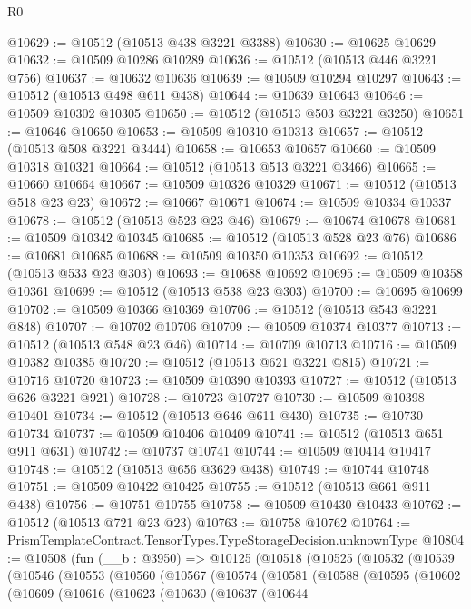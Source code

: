 \begin{lexlean}{R0}
\begin{coremodule}
@10629 := @10512 (@10513 @438 @3221 @3388)
@10630 := @10625 @10629
@10632 := @10509 @10286 @10289
@10636 := @10512 (@10513 @446 @3221 @756)
@10637 := @10632 @10636
@10639 := @10509 @10294 @10297
@10643 := @10512 (@10513 @498 @611 @438)
@10644 := @10639 @10643
@10646 := @10509 @10302 @10305
@10650 := @10512 (@10513 @503 @3221 @3250)
@10651 := @10646 @10650
@10653 := @10509 @10310 @10313
@10657 := @10512 (@10513 @508 @3221 @3444)
@10658 := @10653 @10657
@10660 := @10509 @10318 @10321
@10664 := @10512 (@10513 @513 @3221 @3466)
@10665 := @10660 @10664
@10667 := @10509 @10326 @10329
@10671 := @10512 (@10513 @518 @23 @23)
@10672 := @10667 @10671
@10674 := @10509 @10334 @10337
@10678 := @10512 (@10513 @523 @23 @46)
@10679 := @10674 @10678
@10681 := @10509 @10342 @10345
@10685 := @10512 (@10513 @528 @23 @76)
@10686 := @10681 @10685
@10688 := @10509 @10350 @10353
@10692 := @10512 (@10513 @533 @23 @303)
@10693 := @10688 @10692
@10695 := @10509 @10358 @10361
@10699 := @10512 (@10513 @538 @23 @303)
@10700 := @10695 @10699
@10702 := @10509 @10366 @10369
@10706 := @10512 (@10513 @543 @3221 @848)
@10707 := @10702 @10706
@10709 := @10509 @10374 @10377
@10713 := @10512 (@10513 @548 @23 @46)
@10714 := @10709 @10713
@10716 := @10509 @10382 @10385
@10720 := @10512 (@10513 @621 @3221 @815)
@10721 := @10716 @10720
@10723 := @10509 @10390 @10393
@10727 := @10512 (@10513 @626 @3221 @921)
@10728 := @10723 @10727
@10730 := @10509 @10398 @10401
@10734 := @10512 (@10513 @646 @611 @430)
@10735 := @10730 @10734
@10737 := @10509 @10406 @10409
@10741 := @10512 (@10513 @651 @911 @631)
@10742 := @10737 @10741
@10744 := @10509 @10414 @10417
@10748 := @10512 (@10513 @656 @3629 @438)
@10749 := @10744 @10748
@10751 := @10509 @10422 @10425
@10755 := @10512 (@10513 @661 @911 @438)
@10756 := @10751 @10755
@10758 := @10509 @10430 @10433
@10762 := @10512 (@10513 @721 @23 @23)
@10763 := @10758 @10762
@10764 := PrismTemplateContract.TensorTypes.TypeStorageDecision.unknownType
@10804 := @10508
    (fun (__b : @3950) =>
    @10125
      (@10518
        (@10525
          (@10532
            (@10539
              (@10546
                (@10553
                  (@10560
                    (@10567
                      (@10574
                        (@10581
                          (@10588
                            (@10595
                              (@10602
                                (@10609
                                  (@10616
                                    (@10623
                                      (@10630
                                        (@10637
                                          (@10644

\end{coremodule}
\end{lexlean}
